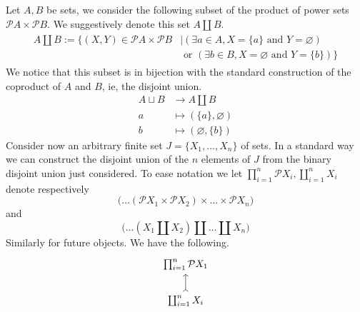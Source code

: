 \documentclass{birkjour}
\theoremstyle{plain}
\theoremstyle{definition}
\newcommand{\call}[1]{\mathcal{#1}}
\newcommand{\lto}{\longrightarrow}
\begin{document}
	Let $A,B$ be sets, we consider the following subset of the product of power sets $\call{P}A \times \call{P}B$. We suggestively denote this set $A \coprod B$.
	\begin{align}
		\begin{split}
			\label{eq:bin_disjoint_union}A \coprod B := \big\lbrace (X,Y) \in \call{P}A \times \call{P}B &\mid (\exists a \in A, X = \lbrace a \rbrace \text{ and }Y = \varnothing)\\
			&\text{ or } (\exists b \in B, X = \varnothing \text{ and }Y = \lbrace b \rbrace )\big\rbrace
		\end{split}
	\end{align}
	We notice that this subset is in bijection with the standard construction of the coproduct of $A$ and $B$, ie, the disjoint union.
	\begin{align*}
		A \sqcup B &\lto A \coprod B\\
		a &\longmapsto (\lbrace a \rbrace, \varnothing)\\
		b &\longmapsto (\varnothing, \lbrace b \rbrace)
	\end{align*}
	Consider now an arbitrary finite set $J = \lbrace X_1,...,X_n\rbrace$ of sets. In a standard way we can construct the disjoint union of the $n$ elements of $J$ from the binary disjoint union just considered. To ease notation we let $\prod_{i = 1}^n\call{P}X_i, \coprod_{i = 1}^n X_i$ denote respectively 
	\begin{equation*}
		\big(\hdots (\call{P}X_1 \times \call{P}X_2)\times \hdots \times\call{P}X_n\big)
	\end{equation*}
	and
	\begin{equation*}
		\big(\hdots (X_1 \coprod X_2) \coprod \hdots \coprod X_n\big)
	\end{equation*}
	Similarly for future objects. We have the following.
	\begin{equation}
		\begin{tikzcd}
			\prod_{i=1}^n \call{P}X_1\\
			\coprod_{i = 1}^n X_i\arrow[u,rightarrowtail]
		\end{tikzcd}
	\end{equation}
\end{document}
